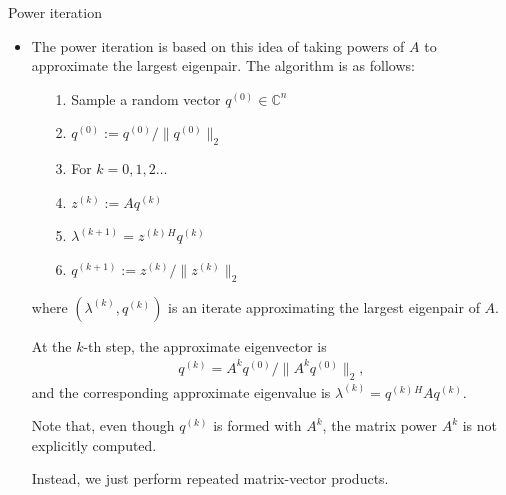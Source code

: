 \documentclass[t,usepdftitle=false]{beamer}
\begin{document}
\begin{frame}{Power iteration}
\begin{itemize}
\item The power iteration is based on this idea of taking powers of $A$ to approximate the largest eigenpair.
The algorithm is as follows:\vspace{.15cm}
\begin{itemize}\normalsize
\item[1.] Sample a random vector $q^{(0)}\in\mathbb{C}^n$\vspace{.1cm}
\item[2.]$q^{(0)}:=q^{(0)}/\|q^{(0)}\|_2$\vspace{.1cm}
\item[3.]For $k=0,1,2\dots$\vspace{.1cm}
\item[4.]\hspace{.4cm}$z^{(k)}:=Aq^{(k)}$\vspace{.1cm}
\item[5.]\hspace{.4cm}$\lambda^{(k+1)}=z^{(k)}{}^Hq^{(k)}$\vspace{.1cm}
\item[6.]\hspace{.4cm}$q^{(k+1)}:=z^{(k)}/\|z^{(k)}\|_2$
\end{itemize}\vspace{.15cm}
where $(\lambda^{(k)},q^{(k)})$ is an iterate approximating the largest eigenpair of $A$.
\item[]At the $k$-th step, the approximate eigenvector is 
\begin{align*}
q^{(k)}=A^kq^{(0)}/\|A^kq^{(0)}\|_2,
\end{align*}
and the corresponding approximate eigenvalue is $\lambda^{(k)}=q^{(k)}{}^HAq^{(k)}$.
\item[]Note that, even though $q^{(k)}$ is formed with $A^k$, the matrix power $A^k$ is not explicitly computed.
\item[]Instead, we just perform repeated matrix-vector products.
\end{itemize}
\end{frame}
\end{document}
